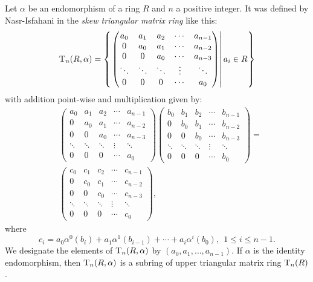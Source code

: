 \documentclass[12pt]{amsart}
\theoremstyle{definition}
\begin{document}
Let $\alpha$ be an endomorphism of a ring $R$ and $n$ a positive integer. It was defined by Nasr-Isfahani in \cite{3} the {\it skew triangular matrix ring} like this:
$${\rm T}_{n}(R,\alpha )=\left\{ \left. \begin{pmatrix}
	a_{0} & a_{1} & a_{2} & \cdots & a_{n-1} \\
	0 & a_{0} & a_{1} & \cdots & a_{n-2} \\
	0 & 0 & a_{0} & \cdots & a_{n-3} \\
	\ddots & \ddots & \ddots & \vdots & \ddots \\
	0 & 0 & 0 & \cdots & a_{0}
\end{pmatrix} \right| a_{i}\in R \right\}$$
with addition point-wise and multiplication given by:
\begin{align*}
&\begin{pmatrix}
		a_{0} & a_{1} & a_{2} & \cdots & a_{n-1} \\
		0 & a_{0} & a_{1} & \cdots & a_{n-2} \\
		0 & 0 & a_{0} & \cdots & a_{n-3} \\
		\ddots & \ddots & \ddots & \vdots & \ddots \\
		0 & 0 & 0 & \cdots & a_{0}
	\end{pmatrix}\begin{pmatrix}
		b_{0} & b_{1} & b_{2} & \cdots & b_{n-1} \\
		0 & b_{0} & b_{1} & \cdots & b_{n-2} \\
		0 & 0 & b_{0} & \cdots & b_{n-3} \\
		\ddots & \ddots & \ddots & \vdots & \ddots \\
		0 & 0 & 0 & \cdots & b_{0}
	\end{pmatrix}  =\\
	& \begin{pmatrix}
		c_{0} & c_{1} & c_{2} & \cdots & c_{n-1} \\
		0 & c_{0} & c_{1} & \cdots & c_{n-2} \\
		0 & 0 & c_{0} & \cdots & c_{n-3} \\
		\ddots & \ddots & \ddots & \vdots & \ddots \\
		0 & 0 & 0 & \cdots & c_{0}
\end{pmatrix},
\end{align*}
where $$c_{i}=a_{0}\alpha^{0}(b_{i})+a_{1}\alpha^{1}(b_{i-1})+\cdots +a_{i}\alpha^{i}(b_{0}),~~ 1\leq i\leq n-1
.$$ We designate the elements of ${\rm T}_{n}(R, \alpha)$ by $(a_{0},a_{1},\ldots , a_{n-1})$. If $\alpha $ is the identity endomorphism, then ${\rm T}_{n}(R,\alpha)$ is a subring of upper triangular matrix ring ${\rm T}_{n}(R)$.
\end{document}
